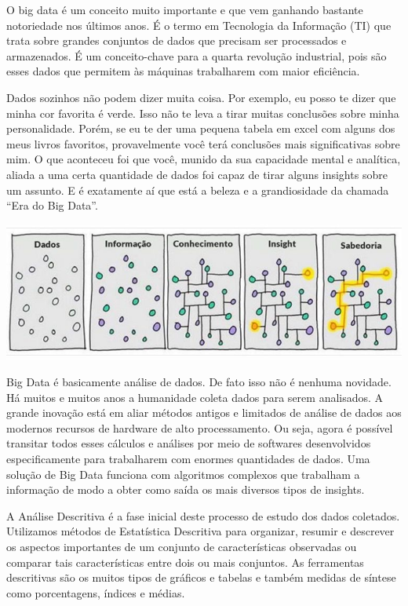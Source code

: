 \documentclass[
]{book}
\begin{document}
O big data é um conceito muito importante e que vem ganhando bastante notoriedade nos últimos anos. É o termo em Tecnologia da Informação (TI) que trata sobre grandes conjuntos de dados que precisam ser processados e armazenados. É um conceito-chave para a quarta revolução industrial, pois são esses dados que permitem às máquinas trabalharem com maior eficiência.

Dados sozinhos não podem dizer muita coisa. Por exemplo, eu posso te dizer que minha cor favorita é verde. Isso não te leva a tirar muitas conclusões sobre minha personalidade. Porém, se eu te der uma pequena tabela em excel com alguns dos meus livros favoritos, provavelmente você terá conclusões mais significativas sobre mim. O que aconteceu foi que você, munido da sua capacidade mental e analítica, aliada a uma certa quantidade de dados foi capaz de tirar alguns insights sobre um assunto. E é exatamente aí que está a beleza e a grandiosidade da chamada ``Era do Big Data''.

\includegraphics{dados_sabedoria.jpg}

Big Data é basicamente análise de dados. De fato isso não é nenhuma novidade. Há muitos e muitos anos a humanidade coleta dados para serem analisados. A grande inovação está em aliar métodos antigos e limitados de análise de dados aos modernos recursos de hardware de alto processamento. Ou seja, agora é possível transitar todos esses cálculos e análises por meio de softwares desenvolvidos especificamente para trabalharem com enormes quantidades de dados. Uma solução de Big Data funciona com algoritmos complexos que trabalham a informação de modo a obter como saída os mais diversos tipos de insights.

A Análise Descritiva é a fase inicial deste processo de estudo dos dados coletados. Utilizamos métodos de Estatística Descritiva para organizar, resumir e descrever os aspectos importantes de um conjunto de características observadas ou comparar tais características entre dois ou mais conjuntos. As ferramentas descritivas são os muitos tipos de gráficos e tabelas e também medidas de síntese como porcentagens, índices e médias.
\end{document}
